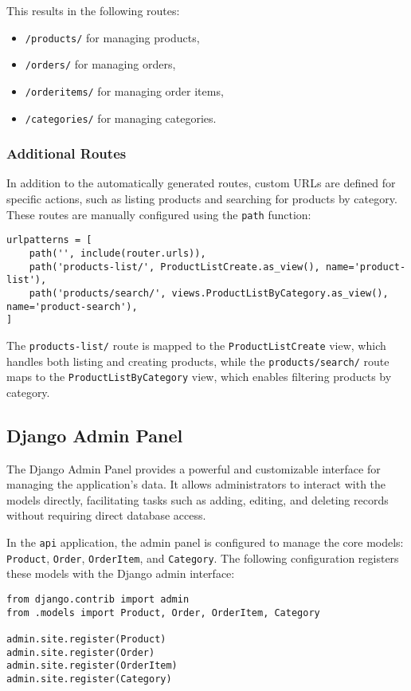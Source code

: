 This results in the following routes:
\begin{itemize}
    \item \texttt{/products/} for managing products,
    \item \texttt{/orders/} for managing orders,
    \item \texttt{/orderitems/} for managing order items,
    \item \texttt{/categories/} for managing categories.
\end{itemize}

\subsubsection{Additional Routes}
In addition to the automatically generated routes, custom URLs are defined for specific actions, such as listing products and searching for products by category. These routes are manually configured using the \texttt{path} function:

\begin{verbatim}
urlpatterns = [
    path('', include(router.urls)),  
    path('products-list/', ProductListCreate.as_view(), name='product-list'),
    path('products/search/', views.ProductListByCategory.as_view(), name='product-search'),
]
\end{verbatim}

The \texttt{products-list/} route is mapped to the \texttt{ProductListCreate} view, which handles both listing and creating products, while the \texttt{products/search/} route maps to the \texttt{ProductListByCategory} view, which enables filtering products by category.

\subsection{Django Admin Panel}

The Django Admin Panel provides a powerful and customizable interface for managing the application's data. It allows administrators to interact with the models directly, facilitating tasks such as adding, editing, and deleting records without requiring direct database access.

In the \texttt{api} application, the admin panel is configured to manage the core models: \texttt{Product}, \texttt{Order}, \texttt{OrderItem}, and \texttt{Category}. The following configuration registers these models with the Django admin interface:

\begin{verbatim}
from django.contrib import admin
from .models import Product, Order, OrderItem, Category

admin.site.register(Product)
admin.site.register(Order)
admin.site.register(OrderItem)
admin.site.register(Category)
\end{verbatim}


